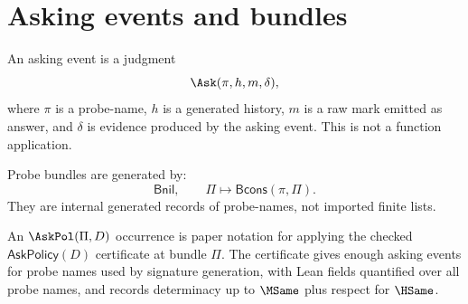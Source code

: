 \section{Asking events and bundles}

\begin{definition}
\label{def:proof-sprint-asking-event}
An asking event is a judgment
$$
\Ask(\pi,h,m,\delta),
$$
where \(\pi\) is a probe-name, \(h\) is a generated history, \(m\) is a raw mark emitted as answer, and \(\delta\) is evidence produced by the asking event.  This is not a function application.
\end{definition}

\begin{definition}
Probe bundles are generated by:
$$
\mathsf{Bnil},
\qquad
\Pi\mapsto \mathsf{Bcons}(\pi,\Pi).
$$
They are internal generated records of probe-names, not imported finite lists.
\end{definition}

\begin{definition}
\label{def:proof-sprint-ask-policy}
An $\AskPol(\Pi,D)$ occurrence is paper notation for applying the checked $\mathsf{AskPolicy}(D)$ certificate at bundle $\Pi$.
The certificate gives enough asking events for probe names used by signature generation, with Lean fields quantified over all probe names, and records determinacy up to $\MSame$ plus respect for $\HSame$.
\end{definition}
